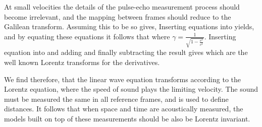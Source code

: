 At small velocities 
the details of the pulse-echo measurement process should become irrelevant,
and the mapping between frames should reduce to the Galilean transform.
Assuming this to be so gives,
Inserting equations  into  yields,
and by equating these equations it follows that
where $\gamma = \frac{1}{\sqrt{1-\frac{v^2}{c^2}}}$.
Inserting equation  into  and adding and finally subtracting the result gives
which are the well known Lorentz transforms for the derivatives.

We find therefore, that the linear wave equation transforms according to the Lorentz equation, where the speed of sound plays the limiting velocity.
The sound must be measured the same in all reference frames, and is used to define distances.
It follows that when space and time are acoustically measured,
the models built on top of these measurements should be also be Lorentz invariant.

